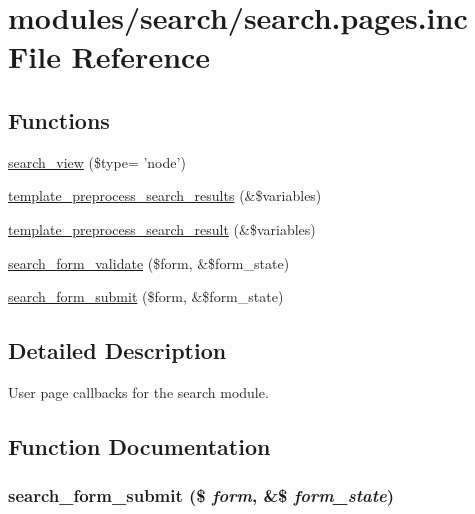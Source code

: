 \hypertarget{search_8pages_8inc}{
\section{modules/search/search.pages.inc File Reference}
\label{search_8pages_8inc}
}
\subsection*{Functions}
\begin{CompactItemize}
\item 
\hyperlink{search_8pages_8inc_3f9e1f2fb608388509992625d8da3fc4}{search\_\-view} (\$type= 'node')
\item 
\hyperlink{search_8pages_8inc_a0012b762375491296b1248124a177e9}{template\_\-preprocess\_\-search\_\-results} (\&\$variables)
\item 
\hyperlink{search_8pages_8inc_45d5ee9444aba311056f3949e503b426}{template\_\-preprocess\_\-search\_\-result} (\&\$variables)
\item 
\hyperlink{search_8pages_8inc_9b4ec561b0b5121050f68541e7047a6d}{search\_\-form\_\-validate} (\$form, \&\$form\_\-state)
\item 
\hyperlink{search_8pages_8inc_709df5e6ae41e0d9cccd0c1f3c0a410e}{search\_\-form\_\-submit} (\$form, \&\$form\_\-state)
\end{CompactItemize}


\subsection{Detailed Description}
User page callbacks for the search module. 

\subsection{Function Documentation}
\hypertarget{search_8pages_8inc_709df5e6ae41e0d9cccd0c1f3c0a410e}{
\subsubsection[{search\_\-form\_\-submit}]{\setlength{\rightskip}{0pt plus 5cm}search\_\-form\_\-submit (\$ {\em form}, \/  \&\$ {\em form\_\-state})}}
\label{search_8pages_8inc_709df5e6ae41e0d9cccd0c1f3c0a410e}


